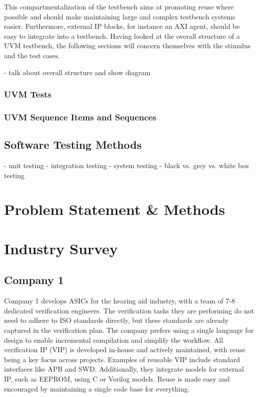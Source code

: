 \documentclass[12pt]{book}
\begin{document}
This compartmentalization of the testbench aims at promoting reuse where possible and should make maintaining large
and complex testbench systems easier. Furthermore, external IP blocks, for instance an AXI agent, should be easy to
integrate into a testbench. Having looked at the overall structure of a UVM testbench, the following sections will
concern themselves with the stimulus and the test cases.

- talk about overall structure and show diagram

\subsection{UVM Tests}

\subsection{UVM Sequence Items and Sequences}

\section{Software Testing Methods} %
- unit testing
- integration testing
- system testing
- black vs. grey vs. white box testing

\chapter{Problem Statement \& Methods} %

\chapter{Industry Survey} %

\section{Company 1}

Company 1 develops ASICs for the hearing aid industry, with a team of 7-8 dedicated verification engineers. The
verification tasks they are performing do not need to adhere to ISO standards directly, but these standards are
already captured in the verification plan. The company prefers using a single language for design to enable
incremental compilation and simplify the workflow. All verification IP (VIP) is developed in-house and actively
maintained, with reuse being a key focus across projects. Examples of reusable VIP include standard interfaces like
APB and SWD. Additionally, they integrate models for external IP, such as EEPROM, using C or Verilog models. Reuse is
made easy and encouraged by maintaining a single code base for everything.
\end{document}
